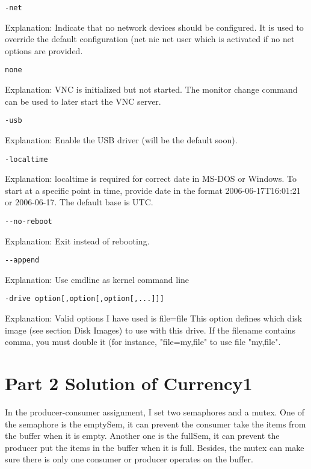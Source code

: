 \documentclass[10pt,draftclsnofoot,peerreview,letterpaper,onecolumn,]{IEEEtran}
\begin{document}
\begin{verbatim}
-net
\end{verbatim}
Explanation: Indicate that no network devices should be configured. It is used to override the default configuration (\-net nic \-net user which is activated if no \-net options are provided.

\begin{verbatim}none\end{verbatim}
Explanation: VNC is initialized but not started. The monitor change command can be used to later start the VNC server.

\begin{verbatim}
-usb
\end{verbatim}
Explanation: Enable the USB driver (will be the default soon).

\begin{verbatim}
-localtime
\end{verbatim}
Explanation: localtime is required for correct date in MS-DOS or Windows. To start at a specific point in time, provide date in the format 2006-06-17T16:01:21 or 2006-06-17. The default base is UTC.

\begin{verbatim}
--no-reboot
\end{verbatim}
Explanation: Exit instead of rebooting.

\begin{verbatim}
--append
\end{verbatim}
Explanation: Use cmdline as kernel command line

\begin{verbatim}
-drive option[,option[,option[,...]]]
\end{verbatim}
Explanation: Valid options I have used is \:
file=file
This option defines which disk image (see section Disk Images) to use with this drive. If the filename contains comma, you must double it (for instance, "file=my,file" to use file "my,file".


\newpage
\section{Part 2 Solution of Currency1}

In the producer-consumer assignment, I set two semaphores and a mutex. One of the semaphore is the emptySem, it can prevent the consumer take the items from the buffer when it is empty. Another one is the fullSem, it can prevent the producer put the items in the buffer when it is full. Besides, the mutex can make sure there is only one consumer or producer operates on the buffer.
\end{document}
